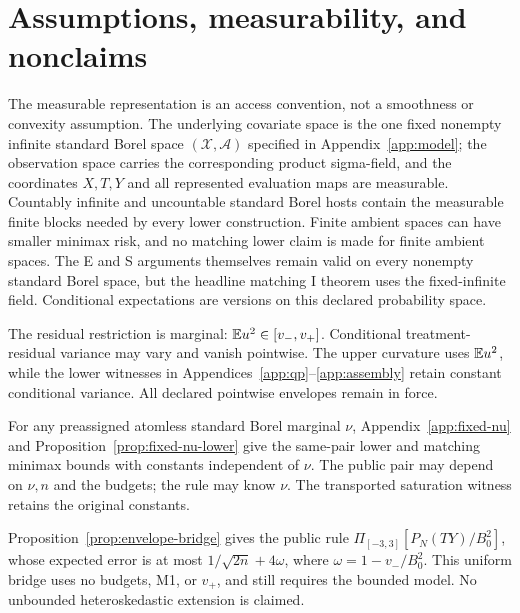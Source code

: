 \section{Assumptions, measurability, and nonclaims}
\label{app:measurability}

The measurable representation is an access convention, not a smoothness or
convexity assumption.  The underlying covariate space is the one fixed
nonempty infinite standard Borel space \((\mathcal X,\mathcal A)\) specified
in Appendix~\ref{app:model}; the observation space carries the corresponding
product sigma-field, and the coordinates \(X,T,Y\) and all represented
evaluation maps are measurable.  Countably infinite and uncountable standard
Borel hosts contain the measurable finite blocks needed by every lower
construction.  Finite ambient spaces can have smaller minimax risk, and no
matching lower claim is made for finite ambient spaces.  The E and S arguments
themselves remain valid on every nonempty standard Borel space, but the
headline matching I theorem uses the fixed-infinite field.  Conditional
expectations are versions on this declared probability space.

The residual restriction is marginal: \(\mathbb E u^2\in[v_-,v_+]\).
Conditional treatment-residual variance may vary and vanish pointwise.
The upper curvature uses \(\mathbb E u^2\), while the lower witnesses in
Appendices~\ref{app:qp}--\ref{app:assembly} retain constant conditional
variance.  All declared pointwise envelopes remain in force.

For any preassigned atomless standard Borel marginal \(\nu\),
Appendix~\ref{app:fixed-nu} and Proposition~\ref{prop:fixed-nu-lower}
give the same-pair lower and matching minimax bounds with constants
independent of \(\nu\).  The public pair may depend on \(\nu,n\) and the
budgets; the rule may know \(\nu\).  The transported saturation witness
retains the original constants.

Proposition~\ref{prop:envelope-bridge} gives the public rule
\(\Pi_{[-3,3]}[P_N(TY)/B_0^2]\), whose expected error is at most
\(1/\sqrt{2n}+4\omega\), where \(\omega=1-v_-/B_0^2\).
This uniform bridge uses no budgets, M1, or \(v_+\), and still requires
the bounded model.  No unbounded heteroskedastic extension is claimed.

